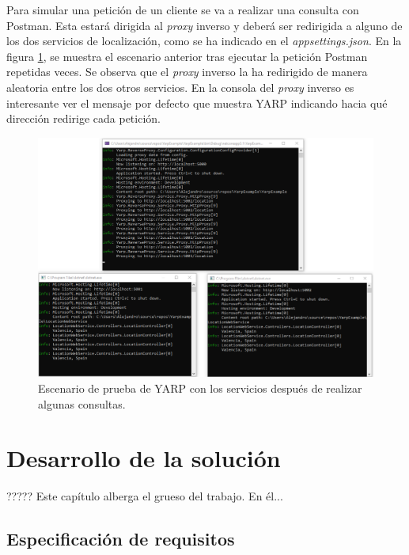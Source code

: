 \documentclass[11pt,spanish,listoffigures]{tfgetsinf}
\begin{document}
Para simular una petición de un cliente se va a realizar una consulta con Postman. Esta estará dirigida al \emph{proxy} inverso y deberá ser redirigida a alguno de los dos servicios de localización, como se ha indicado en el \emph{appsettings.json}. En la figura \ref{ejemploYARP_servicios_funcionando}, se muestra el escenario anterior tras ejecutar la petición Postman repetidas veces. Se observa que el \emph{proxy} inverso la ha redirigido de manera aleatoria entre los dos otros servicios. En la consola del \emph{proxy} inverso es interesante ver el mensaje por defecto que muestra YARP indicando hacia qué dirección redirige cada petición.

\begin{figure}[ht]
\centering
\includegraphics[width=1\textwidth]{imagenes/ejemploYARP/servicios_funcionando}
\caption{Escenario de prueba de YARP con los servicios después de realizar algunas consultas.}
	\label{ejemploYARP_servicios_funcionando}
\end{figure}


\chapter{Desarrollo de la solución}

????? Este capítulo alberga el grueso del trabajo. En él...


	\section{Especificación de requisitos} \label{especificacionRequisitos}
\end{document}

